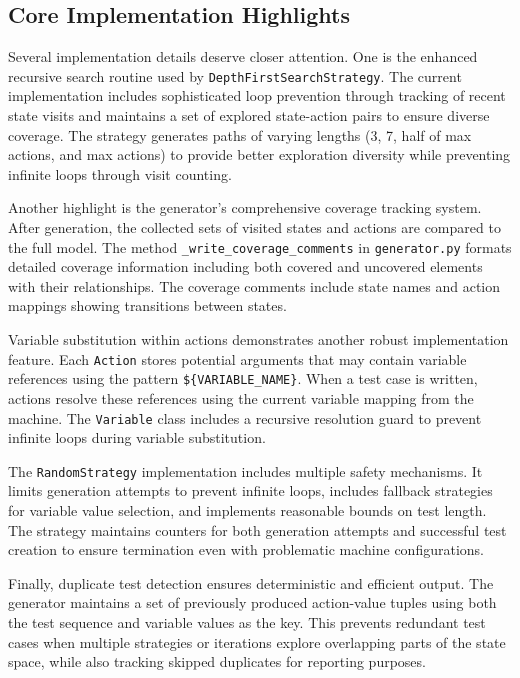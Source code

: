 \subsection{Core Implementation Highlights}

Several implementation details deserve closer attention.  One is the enhanced
recursive search routine used by \texttt{DepthFirstSearchStrategy}.  The current
implementation includes sophisticated loop prevention through tracking of recent
state visits and maintains a set of explored state-action pairs to ensure diverse
coverage.  The strategy generates paths of varying lengths (3, 7, half of max
actions, and max actions) to provide better exploration diversity while
preventing infinite loops through visit counting.

Another highlight is the generator's comprehensive coverage tracking system.
After generation, the collected sets of visited states and actions are compared
to the full model.  The method \texttt{\_write\_coverage\_comments} in
\texttt{generator.py} formats detailed coverage information including both
covered and uncovered elements with their relationships.  The coverage comments
include state names and action mappings showing transitions between states.

Variable substitution within actions demonstrates another robust implementation
feature.  Each \texttt{Action} stores potential arguments that may contain
variable references using the pattern \texttt{\$\{VARIABLE\_NAME\}}.  When a test
case is written, actions resolve these references using the current variable
mapping from the machine.  The \texttt{Variable} class includes a recursive
resolution guard to prevent infinite loops during variable substitution.

The \texttt{RandomStrategy} implementation includes multiple safety mechanisms.
It limits generation attempts to prevent infinite loops, includes fallback
strategies for variable value selection, and implements reasonable bounds on test
length.  The strategy maintains counters for both generation attempts and
successful test creation to ensure termination even with problematic machine
configurations.

Finally, duplicate test detection ensures deterministic and efficient output.
The generator maintains a set of previously produced action-value tuples using
both the test sequence and variable values as the key.  This prevents redundant
test cases when multiple strategies or iterations explore overlapping parts of
the state space, while also tracking skipped duplicates for reporting purposes.
